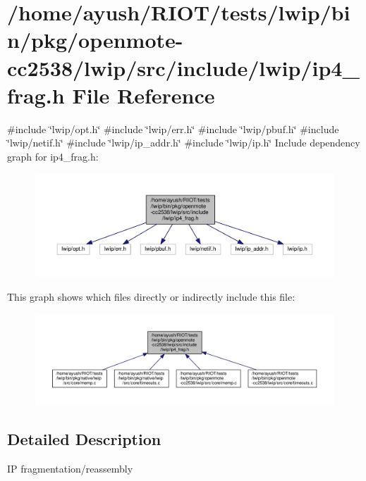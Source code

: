 \hypertarget{openmote-cc2538_2lwip_2src_2include_2lwip_2ip4__frag_8h}{}\section{/home/ayush/\+R\+I\+O\+T/tests/lwip/bin/pkg/openmote-\/cc2538/lwip/src/include/lwip/ip4\+\_\+frag.h File Reference}
\label{openmote-cc2538_2lwip_2src_2include_2lwip_2ip4__frag_8h}
{\ttfamily \#include \char`\"{}lwip/opt.\+h\char`\"{}}\newline
{\ttfamily \#include \char`\"{}lwip/err.\+h\char`\"{}}\newline
{\ttfamily \#include \char`\"{}lwip/pbuf.\+h\char`\"{}}\newline
{\ttfamily \#include \char`\"{}lwip/netif.\+h\char`\"{}}\newline
{\ttfamily \#include \char`\"{}lwip/ip\+\_\+addr.\+h\char`\"{}}\newline
{\ttfamily \#include \char`\"{}lwip/ip.\+h\char`\"{}}\newline
Include dependency graph for ip4\+\_\+frag.\+h\+:
\nopagebreak
\begin{figure}[H]
\begin{center}
\leavevmode
\includegraphics[width=350pt]{openmote-cc2538_2lwip_2src_2include_2lwip_2ip4__frag_8h__incl}
\end{center}
\end{figure}
This graph shows which files directly or indirectly include this file\+:
\nopagebreak
\begin{figure}[H]
\begin{center}
\leavevmode
\includegraphics[width=350pt]{openmote-cc2538_2lwip_2src_2include_2lwip_2ip4__frag_8h__dep__incl}
\end{center}
\end{figure}


\subsection{Detailed Description}
IP fragmentation/reassembly 